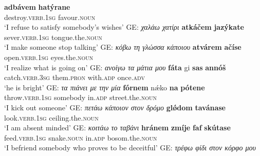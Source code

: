 \documentclass[output=paper,colorlinks,citecolor=brown]{langscibook}
\begin{document}

 \ea \label{ex:lvc2}
 \begin{xlist}
 \ex
\gll  \textbf{{adbávem}} \textbf{{hatýrane}} \\
{destroy}.\textsc{verb.1sg}   favour.\textsc{noun}\\
\glt `I refuse to satisfy somebody's wishes' GE: \textit{χαλάω χατίρι}
\ex
\gll \textbf{{atkáčem}}  \textbf{{jazýkate}}  \\
{sever}.\textsc{verb.1sg}  {tongue.the}.\textsc{noun}\\
\glt `I make someone stop talking' GE:  \textit{κόβω τη γλώσσα κάποιου}
\ex
\gll \textbf{{atvárem}}  \textbf{{ačíse}}  \\
{open}.\textsc{verb.1sg}   {eyes.the}.\textsc{noun}\\
\glt `I realize what is going on' GE: \textit{ανοίγω τα μάτια μου}
\ex
\gll \textbf{{fáta}}  gi \textbf{{sas}} \textbf{{annóš}} \\
    catch.\textsc{verb.3sg} them.\textsc{pron} with.\textsc{adp} once.\textsc{adv}\\
\glt `he is bright' GE:  \textit{ τα πιάνει με την μία}
\ex
\gll \textbf{{fórnem}} nǽko \textbf{{na}} \textbf{{pótene}}\\
{throw}.\textsc{verb.1sg} somebody in.\textsc{adp} street.the.\textsc{noun}\\
    \glt `I kick out someone' GE:  \textit{ πετάω κάποιον στον δρόμο}
\ex
\gll \textbf{{glǿdom}} \textbf{{tavánase}}\\
{look}.\textsc{verb.1sg} {ceiling.the}.\textsc{noun}\\
\glt `I am  absent minded' GE:  \textit{  κοιτάω το ταβάνι}
\ex 
\gll \textbf{{hránem }} \textbf{{zmíje}} \textbf{{faf}} \textbf{{skútase}}\\ 
{feed}.\textsc{verb.1sg} snake.\textsc{noun} in.\textsc{adp}  bosom.the.\textsc{noun}\\
\glt `I befriend somebody who proves to be deceitful' GE:  \textit{τρέφω φίδι στον κόρφο μου}

\end{xlist}
\end{document}
